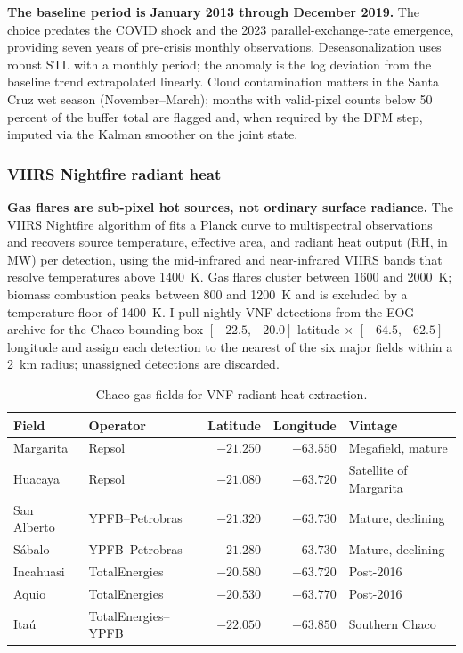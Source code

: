 \documentclass[11pt,letterpaper]{article}
\newcommand{\claim}[1]{\textbf{#1.}}
\begin{document}
\claim{The baseline period is January \num{2013} through December \num{2019}} The choice predates the COVID shock and the \num{2023} parallel-exchange-rate emergence, providing seven years of pre-crisis monthly observations. Deseasonalization uses robust STL with a monthly period; the anomaly is the log deviation from the baseline trend extrapolated linearly. Cloud contamination matters in the Santa Cruz wet season (November--March); months with valid-pixel counts below \num{50} percent of the buffer total are flagged and, when required by the DFM step, imputed via the Kalman smoother on the joint state.

\subsubsection{VIIRS Nightfire radiant heat}

\claim{Gas flares are sub-pixel hot sources, not ordinary surface radiance} The VIIRS Nightfire algorithm of \citet{elvidge_vnf2013} fits a Planck curve to multispectral observations and recovers source temperature, effective area, and radiant heat output (RH, in MW) per detection, using the mid-infrared and near-infrared VIIRS bands that resolve temperatures above \num{1400}~K. Gas flares cluster between \num{1600} and \num{2000}~K; biomass combustion peaks between \num{800} and \num{1200}~K and is excluded by a temperature floor of \num{1400}~K. I pull nightly VNF detections from the EOG archive for the Chaco bounding box $[-22.5, -20.0]$ latitude $\times$ $[-64.5, -62.5]$ longitude and assign each detection to the nearest of the six major fields within a \num{2}~km radius; unassigned detections are discarded.

\begin{table}[H]
\centering
\caption{Chaco gas fields for VNF radiant-heat extraction.}
\label{tab:chaco_fields}
\small
\begin{tabular}{llrrl}
\toprule
Field & Operator & Latitude & Longitude & Vintage \\
\midrule
Margarita & Repsol & $-21.250$ & $-63.550$ & Megafield, mature \\
Huacaya & Repsol & $-21.080$ & $-63.720$ & Satellite of Margarita \\
San Alberto & YPFB--Petrobras & $-21.320$ & $-63.730$ & Mature, declining \\
Sábalo & YPFB--Petrobras & $-21.280$ & $-63.730$ & Mature, declining \\
Incahuasi & TotalEnergies & $-20.580$ & $-63.720$ & Post-\num{2016} \\
Aquio & TotalEnergies & $-20.530$ & $-63.770$ & Post-\num{2016} \\
Itaú & TotalEnergies--YPFB & $-22.050$ & $-63.850$ & Southern Chaco \\
\bottomrule
\end{tabular}
\end{table}
\end{document}
